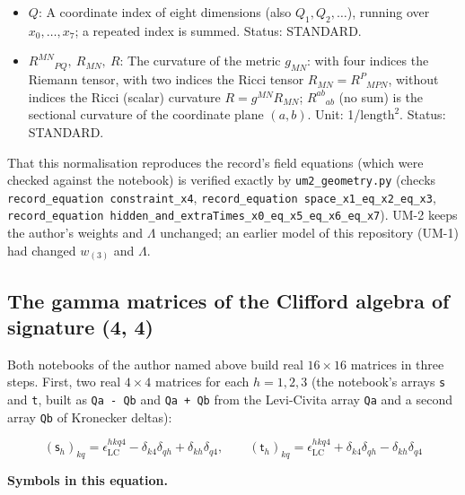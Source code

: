 \documentclass[
  10pt,
]{article}
\begin{document}
\begin{itemize}
  \(P\): A coordinate index of eight dimensions (also
  \(P_1, P_2, \dots\)), running over \(x_0, \dots, x_7\); a repeated
  index is summed. Status: STANDARD.
\item
  \(Q\): A coordinate index of eight dimensions (also
  \(Q_1, Q_2, \dots\)), running over \(x_0, \dots, x_7\); a repeated
  index is summed. Status: STANDARD.
\item
  \(R^{MN}{}_{PQ},\ R_{MN},\ R\): The curvature of the metric
  \(g_{MN}\): with four indices the Riemann tensor, with two indices the
  Ricci tensor \(R_{MN} = R^P{}_{MPN}\), without indices the Ricci
  (scalar) curvature \(R = g^{MN}R_{MN}\); \(R^{ab}{}_{ab}\) (no sum) is
  the sectional curvature of the coordinate plane \((a, b)\). Unit:
  1/\(\mathrm{length}^{2}\). Status: STANDARD.
\end{itemize}

That this normalisation reproduces the record's field equations (which
were checked against the notebook) is verified exactly by
\texttt{um2\_geometry.py} (checks
\texttt{record\_equation\ constraint\_x4},
\texttt{record\_equation\ space\_x1\_eq\_x2\_eq\_x3},
\texttt{record\_equation\ hidden\_and\_extraTimes\_x0\_eq\_x5\_eq\_x6\_eq\_x7}).
UM-2 keeps the author's weights and \(\Lambda\) unchanged; an earlier
model of this repository (UM-1) had changed \(w_{(3)}\) and \(\Lambda\).

\hypertarget{the-gamma-matrices-of-the-clifford-algebra-of-signature-4-4}{%
\subsection{The gamma matrices of the Clifford algebra of signature (4,
4)}\label{the-gamma-matrices-of-the-clifford-algebra-of-signature-4-4}}

Both notebooks of the author named above build real \(16\times16\)
matrices in three steps. First, two real \(4\times4\) matrices for each
\(h = 1, 2, 3\) (the notebook's arrays \texttt{s} and \texttt{t}, built
as \texttt{Qa\ -\ Qb} and \texttt{Qa\ +\ Qb} from the Levi-Civita array
\texttt{Qa} and a second array \texttt{Qb} of Kronecker deltas):

\[
(\mathsf{s}_h)_{kq} = \epsilon_{\mathrm{LC}}^{hkq4} - \delta_{k4}\delta_{qh} + \delta_{kh}\delta_{q4},\qquad
(\mathsf{t}_h)_{kq} = \epsilon_{\mathrm{LC}}^{hkq4} + \delta_{k4}\delta_{qh} - \delta_{kh}\delta_{q4}
\]

\textbf{Symbols in this equation.}
\end{document}
